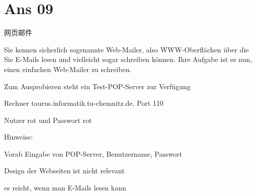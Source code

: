 \documentclass[fleqn]{article}
\begin{document}
\section{Ans 09}

\noindent 网页邮件

Sie kennen sicherlich sogenannte Web-Mailer, also WWW-Oberflächen über die Sie E-Mails lesen und vielleicht sogar schreiben können. Ihre Aufgabe ist es nun, einen einfachen Web-Mailer zu schreiben.

Zum Ausprobieren steht ein Test-POP-Server zur Verfügung 

\qquad Rechner taurus.informatik.tu-chemnitz.de, Port 110 

\qquad Nutzer rot und Passwort rot

Hinweise: 

\qquad Vorab Eingabe von POP-Server, Benutzername, Passwort

\qquad Design der Webseiten ist nicht relevant 

\qquad es reicht, wenn man E-Mails lesen kann
\end{document}
